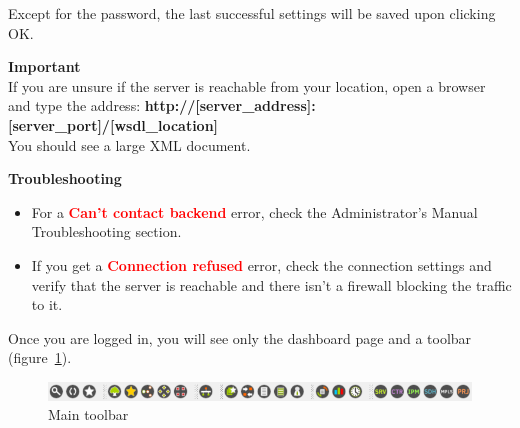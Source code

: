 \documentclass[a4paper]{article}
\begin{document}
	Except for the password, the last successful settings will be saved upon clicking OK.
	\begin{framed} {\large \textbf{Important}} \\
		If you are unsure if the server is reachable from your location, open a browser and type the address: \textbf{http://[server\_address]:[server\_port]/[wsdl\_location]}\\
		
		You should see a large XML document.
	\end{framed}
	\begin{framed} {\large \textbf{Troubleshooting}}
		\begin{itemize}
			\item For a \textbf{\textcolor{red}{Can't contact backend}} error, check the Administrator's Manual Troubleshooting section.
			\item If you get a \textbf{\textcolor{red}{Connection refused}} error, check the connection settings and verify that the server is reachable and there isn't a firewall blocking the traffic to it.
		\end{itemize}
	\end{framed} 
	Once you are logged in, you will see only the dashboard page and a toolbar (figure~\ref{fig:main_toolbar}).\\
	\begin{figure}[h!]
		\centering
		\includegraphics[width=0.7\linewidth]{img/main_toolbar.png}
		\caption{Main toolbar}
		\label{fig:main_toolbar}
	\end{figure}
	
\end{document}
